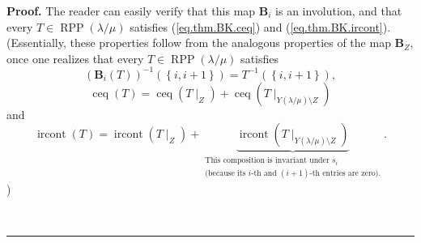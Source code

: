 \documentclass[numbers=enddot,12pt,final,onecolumn,notitlepage]{scrartcl}%
\theoremstyle{definition}
\newenvironment{proof}[1][Proof]{\noindent\textbf{#1.} }{\ \rule{0.5em}{0.5em}}
\newenvironment{vershort}{}{}
\begin{document}
\begin{vershort}
\begin{proof}
The reader can easily verify that this map $\mathbf{B}_{i}$ is an involution,
and that every $T\in\operatorname*{RPP}\left(  \lambda/\mu\right)  $ satisfies
(\ref{eq.thm.BK.ceq}) and (\ref{eq.thm.BK.ircont}). (Essentially, these
properties follow from the analogous properties of the map $\mathbf{B}_{Z}$,
once one realizes that every $T\in\operatorname*{RPP}\left(  \lambda
/\mu\right)  $ satisfies%
\[
\left(  \mathbf{B}_{i}\left(  T\right)  \right)  ^{-1}\left(  \left\{
i,i+1\right\}  \right)  =T^{-1}\left(  \left\{  i,i+1\right\}  \right)  ,
\]
\[
\operatorname*{ceq}\left(  T\right)  =\operatorname*{ceq}\left(  T\mid
_{Z}\right)  +\operatorname*{ceq}\left(  T\mid_{Y\left(  \lambda/\mu\right)
\setminus Z}\right)
\]
and%
\[
\operatorname*{ircont}\left(  T\right)  =\operatorname*{ircont}\left(
T\mid_{Z}\right)  +\underbrace{\operatorname*{ircont}\left(  T\mid_{Y\left(
\lambda/\mu\right)  \setminus Z}\right)  }_{\substack{\text{This composition
is invariant under }s_{i}\\\text{(because its }i\text{-th and }\left(
i+1\right)  \text{-th entries are zero).}}}.
\]
) 


\end{proof}
\end{vershort}
\end{document}
